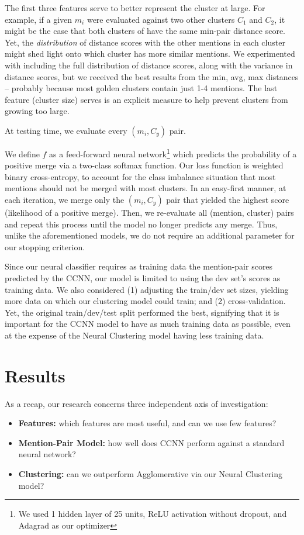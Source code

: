 \documentclass[11pt,a4paper]{article}
\begin{document}
The first three features serve to better represent the cluster at large.  For example, if a given $m_i$ were evaluated against two other clusters $C_1$ and $C_2$, it might be the case that both clusters of have the same min-pair distance score.  Yet, the \textit{distribution} of distance scores with the other mentions in each cluster might shed light onto which cluster has more similar mentions.  We experimented with including the full distribution of distance scores, along with the variance in distance scores, but we received the best results from the min, avg, max distances -- probably because most golden clusters contain just 1-4 mentions.  The last feature (cluster size) serves is an explicit measure to help prevent clusters from growing too large.

At testing time, we evaluate every $(m_i, C_y)$ pair.  

We define $f$ as a feed-forward neural network\footnote{We used 1 hidden layer of 25 units, ReLU activation without dropout, and Adagrad as our optimizer} which predicts the probability of a positive merge via a two-class softmax function.  Our loss function is weighted binary cross-entropy, to account for the class imbalance situation that most mentions should not be merged with most clusters.  In an easy-first manner, at each iteration, we merge only the $(m_i,C_y)$ pair that yielded the highest score (likelihood of a positive merge).  Then, we re-evaluate all (mention, cluster) pairs and repeat this process until the model no longer predicts any merge.  Thus, unlike the aforementioned models, we do not require an additional parameter for our stopping criterion.

Since our neural classifier requires as training data the mention-pair scores predicted by the CCNN, our model is limited to using the dev set's scores as training data.  We also considered (1) adjusting the train/dev set sizes, yielding more data on which our clustering model could train; and (2) cross-validation.  Yet, the original train/dev/test split performed the best, signifying that it is important for the CCNN model to have as much training data as possible, even at the expense of the Neural Clustering model having less training data.

\section{Results}
As a recap, our research concerns three independent axis of investigation:
\begin{itemize}
\item \textbf{Features:} which features are most useful, and can we use few features?
\item \textbf{Mention-Pair Model:} how well does CCNN perform against a standard neural network?
\item \textbf{Clustering:} can we outperform Agglomerative via our Neural Clustering model?
\end{itemize}
\end{document}
